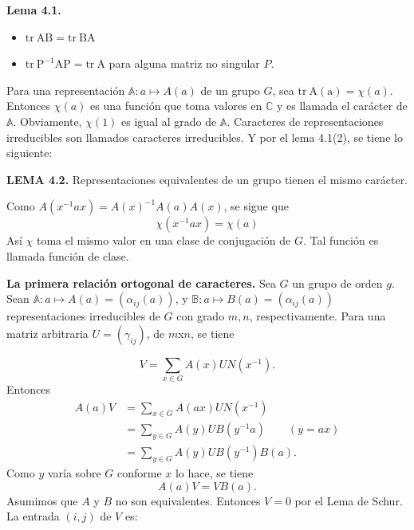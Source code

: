 \documentclass[12pt]{book}
\theoremstyle{definition}
\newcounter{in}
\begin{document}
\textbf{Lema 4.1. }
\begin{itemize}
\item $\mathrm{tr\ AB}=\mathrm{tr\ BA}$
\item $\mathrm{tr\ P^{-1}AP}=\mathrm{tr\ A}$ para alguna matriz no singular $P$.
\end{itemize}

Para una representación $\mathbb{A} \colon a \mapsto A\left(a\right)$
de un grupo $G$, sea $\mathrm{tr\ A(a)}=\chi(a)$. Entonces $\chi(a)$
es una función que toma valores en $\mathbb{C}$ y es llamada el
carácter de $\mathbb{A}$. Obviamente, $\chi(1)$ es igual al grado de
$\mathbb{A}$. Caracteres de representaciones irreducibles son llamados
caracteres irreducibles. Y por el lema 4.1(2), se tiene lo siguiente:

\textbf{LEMA 4.2. } Representaciones equivalentes de un grupo tienen
el mismo carácter.

Como $A(x^{-1}ax)=A(x)^{-1}A(a)A(x)$, se sigue que
\begin{equation*}
  \chi(x^{-1}ax)=\chi(a)
\end{equation*}  
Así $\chi$ toma el mismo valor en una clase de conjugación de $G$. Tal
función es llamada función de clase.

\textbf{La primera relación ortogonal de caracteres.} Sea $G$ un grupo
de orden $g$. Sean
$\mathbb{A} \colon a \mapsto A\left(a\right) = (\alpha_{ij}(a))$, y
$\mathbb{B} \colon a \mapsto B\left(a\right) = (\alpha_{ij}(a))$
representaciones irreducibles de $G$ con grado $m,n$,
respectivamente. Para una matriz arbitraria $U=(\gamma_{ij})$, de
$m$x$n$, se tiene

\begin{equation*}
 V=\sum_{x \in G} A(x)UN(x^{-1}).
\end{equation*}
Entonces
\begin{equation*}
  \begin{aligned}
    A(a)V &=\sum_{x \in G} A(ax)UN(x^{-1})\\
    &=\sum_{y \in G} A(y)UB(y^{-1}a) \qquad (y=ax)\\
    &=\sum_{y \in G} A(y)UB(y^{-1})B(a).
  \end{aligned}
\end{equation*}
Como $y$ varía sobre $G$ conforme $x$ lo hace, se tiene
\begin{equation*}
  A(a)V=VB(a).
\end{equation*}  
Asumimos que $A$ y $B$ no son equivalentes. Entonces $V=0$ por el Lema
de Schur. La entrada $(i,j)$ de $V$ es:
\end{document}
